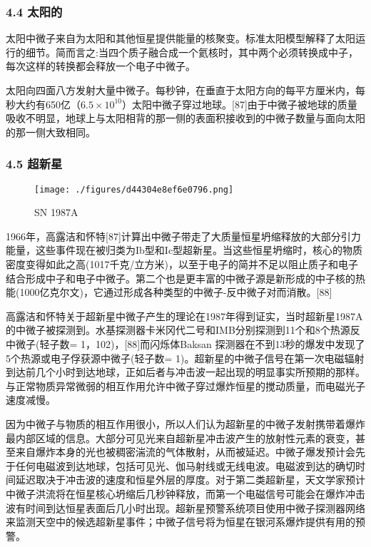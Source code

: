 \subsubsection{4.4 太阳的}
太阳中微子来自为太阳和其他恒星提供能量的核聚变。标准太阳模型解释了太阳运行的细节。简而言之:当四个质子融合成一个氦核时，其中两个必须转换成中子，每次这样的转换都会释放一个电子中微子。

太阳向四面八方发射大量中微子。每秒钟，在垂直于太阳方向的每平方厘米内，每秒大约有650亿（$6.5\times10^{10}$）太阳中微子穿过地球。[87]由于中微子被地球的质量吸收不明显，地球上与太阳相背的那一侧的表面积接收到的中微子数量与面向太阳的那一侧大致相同。

\subsubsection{4.5 超新星}
\begin{figure}[ht]
\centering
\texttt{[image: ./figures/d44304e8ef6e0796.png]}
\caption{SN 1987A} \label{fig_ZWZ_4}
\end{figure}

1966年，高露洁和怀特[87]计算出中微子带走了大质量恒星坍缩释放的大部分引力能量，这些事件现在被归类为Ib型和Ic型超新星。当这些恒星坍缩时，核心的物质密度变得如此之高(1017千克/立方米)，以至于电子的简并不足以阻止质子和电子结合形成中子和电子中微子。第二个也是更丰富的中微子源是新形成的中子核的热能(1000亿克尔文)，它通过形成各种类型的中微子-反中微子对而消散。[88]

高露洁和怀特关于超新星中微子产生的理论在1987年得到证实，当时超新星1987A的中微子被探测到。水基探测器卡米冈代二号和IMB分别探测到11个和8个热源反中微子(轻子数= 1，102)，[88]而闪烁体Baksan 探测器在不到13秒的爆发中发现了5个热源或电子俘获源中微子(轻子数= 1)。超新星的中微子信号在第一次电磁辐射到达前几个小时到达地球，正如后者与冲击波一起出现的明显事实所预期的那样。与正常物质异常微弱的相互作用允许中微子穿过爆炸恒星的搅动质量，而电磁光子速度减慢。

因为中微子与物质的相互作用很小，所以人们认为超新星的中微子发射携带着爆炸最内部区域的信息。大部分可见光来自超新星冲击波产生的放射性元素的衰变，甚至来自爆炸本身的光也被稠密湍流的气体散射，从而被延迟。中微子爆发预计会先于任何电磁波到达地球，包括可见光、伽马射线或无线电波。电磁波到达的确切时间延迟取决于冲击波的速度和恒星外层的厚度。对于第二类超新星，天文学家预计中微子洪流将在恒星核心坍缩后几秒钟释放，而第一个电磁信号可能会在爆炸冲击波有时间到达恒星表面后几小时出现。超新星预警系统项目使用中微子探测器网络来监测天空中的候选超新星事件；中微子信号将为恒星在银河系爆炸提供有用的预警。

